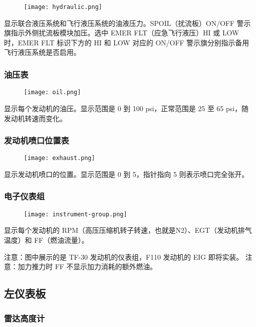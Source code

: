 \begin{figure}[htb]
  \center
  \texttt{[image: hydraulic.png]}
\end{figure}
显示联合液压系统和飞行液压系统的油液压力。SPOIL（扰流板）ON/OFF 警示旗指示外侧扰流板模块加压。选中 EMER FLT（应急飞行液压）HI 或 LOW 时，EMER FLT 标识下方的 HI 和 LOW 对应的 ON/OFF 警示旗分别指示备用飞行液压系统是否启用。

\subsubsection{油压表}

\begin{figure}[htb]
  \center
  \texttt{[image: oil.png]}
\end{figure}
显示每个发动机的油压。显示范围是 0 到 100 psi，正常范围是 25 至 65 psi，随发动机转速而变化。

\subsubsection{发动机喷口位置表}

\begin{figure}[htb]
  \center
  \texttt{[image: exhaust.png]}
\end{figure}
显示发动机喷口的位置。显示范围是 0 到 5，指针指向 5 则表示喷口完全张开。

\subsubsection{电子仪表组}

\begin{figure}[htb]
  \center
  \texttt{[image: instrument-group.png]}
\end{figure}
显示每个发动机的 RPM（高压压缩机转子转速，也就是N2）、EGT（发动机排气温度）和 FF（燃油流量）。

注意：图中展示的是 TF-30 发动机的仪表组，F110 发动机的 EIG 即将实装。
注意：加力推力时 FF 不显示加力消耗的额外燃油。

\subsection{左仪表板}

\subsubsection{雷达高度计}

